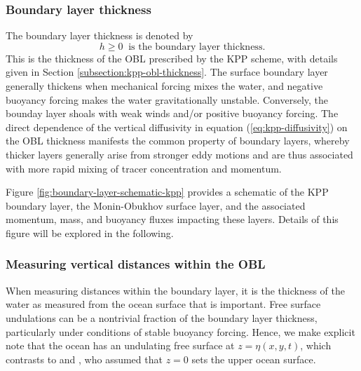 \subsubsection{Boundary layer thickness} 

The boundary layer thickness is denoted by 
\begin{equation}
 h \ge 0 \; \; \mbox{is the boundary layer thickness}.
\label{eq:boundary-layer-thickness}
\end{equation}
This is the thickness of the OBL prescribed by the KPP scheme, with
details given in Section \ref{subsection:kpp-obl-thickness}.  The
surface boundary layer generally thickens when mechanical forcing
mixes the water, and negative buoyancy forcing makes the water
gravitationally unstable.  Conversely, the bounday layer shoals with
weak winds and/or positive buoyancy forcing.  The direct dependence of
the vertical diffusivity in equation (\ref{eq:kpp-diffusivity}) on the
OBL thickness manifests the common property of boundary layers,
whereby thicker layers generally arise from stronger eddy motions and
are thus associated with more rapid mixing of tracer concentration and
momentum.

Figure \ref{fig:boundary-layer-schematic-kpp} provides a schematic of
the KPP boundary layer, the Monin-Obukhov surface layer, and the
associated momentum, mass, and buoyancy fluxes impacting these layers.
Details of this figure will be explored in the following.



\subsubsection{Measuring vertical distances within the OBL}

When measuring distances within the boundary layer, it is the
thickness of the water as measured from the ocean surface that is
important. Free surface undulations can be a nontrivial fraction of
the boundary layer thickness, particularly under conditions of stable
buoyancy forcing. Hence, we make explicit note that the ocean has an
undulating free surface at $z=\eta(x,y,t)$, which contrasts to
\cite{LargeKPP} and \cite{LargeKPP_lectures}, who assumed that $z=0$
sets the upper ocean surface.

